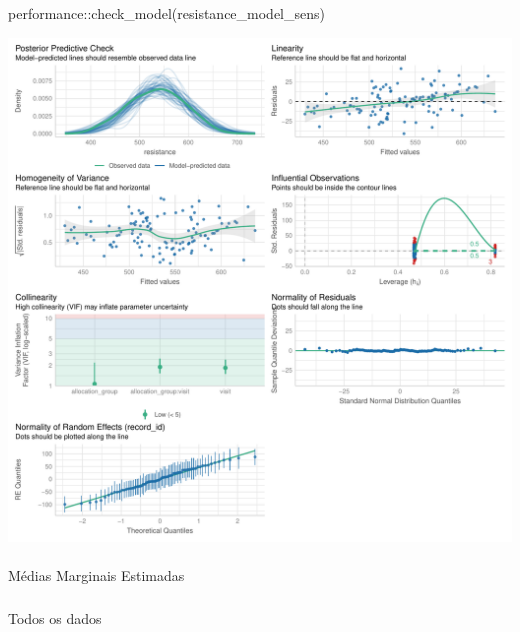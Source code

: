 \documentclass[
  12pt,
]{article}
\makeatletter
\let\oldparagraph\paragraph
\renewcommand{\paragraph}{
    \@ifstar
      \xxxParagraphStar
      \xxxParagraphNoStar
  }
\newcommand{\xxxParagraphStar}[1]{\oldparagraph*{#1}\mbox{}}
\newcommand{\xxxParagraphNoStar}[1]{\oldparagraph{#1}\mbox{}}
\let\oldsubparagraph\subparagraph
\renewcommand{\subparagraph}{
    \@ifstar
      \xxxSubParagraphStar
      \xxxSubParagraphNoStar
  }
\newcommand{\xxxSubParagraphStar}[1]{\oldsubparagraph*{#1}\mbox{}}
\newcommand{\xxxSubParagraphNoStar}[1]{\oldsubparagraph{#1}\mbox{}}
\newenvironment{Shaded}{\begin{snugshade}}{\end{snugshade}}
\newcommand{\FunctionTok}[1]{\textcolor[rgb]{0.28,0.35,0.67}{#1}}
\newcommand{\NormalTok}[1]{\textcolor[rgb]{0.00,0.23,0.31}{#1}}
\newcommand{\SpecialCharTok}[1]{\textcolor[rgb]{0.37,0.37,0.37}{#1}}
\makeatother
\begin{document}
\begin{Shaded}
\begin{Highlighting}[]
\NormalTok{performance}\SpecialCharTok{::}\FunctionTok{check\_model}\NormalTok{(resistance\_model\_sens)}
\end{Highlighting}
\end{Shaded}

\includegraphics{Outcomes_files/figure-pdf/resistance_4-2.pdf}

\paragraph{Médias Marginais
Estimadas}\label{muxe9dias-marginais-estimadas-19}

\subparagraph{Todos os dados}\label{todos-os-dados-19}
\end{document}
